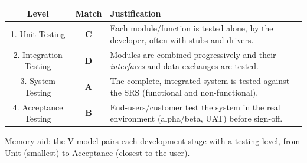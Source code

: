 \documentclass[11pt]{article}
\newcommand{\cle}[1]{{\popxbold\color{popdark}#1}}
\begin{document}
\begin{corrige}
\begin{center}
\begin{tabular}{|c|c|l|}\hline
\rowcolor{popblueL} \textbf{Level} & \textbf{Match} & \textbf{Justification} \\ \hline
1. Unit Testing & \textbf{C} & Each module/function is tested alone, by the developer, often with stubs and drivers. \\ \hline
2. Integration Testing & \textbf{D} & Modules are combined progressively and their \emph{interfaces} and data exchanges are tested. \\ \hline
3. System Testing & \textbf{A} & The complete, integrated system is tested against the SRS (functional and non-functional). \\ \hline
4. Acceptance Testing & \textbf{B} & End-users/customer test the system in the real environment (alpha/beta, UAT) before sign-off. \\ \hline
\end{tabular}
\end{center}
Memory aid: the \cle{V-model} pairs each development stage with a testing level, from Unit (smallest) to Acceptance (closest to the user).
\end{corrige}
\end{document}
